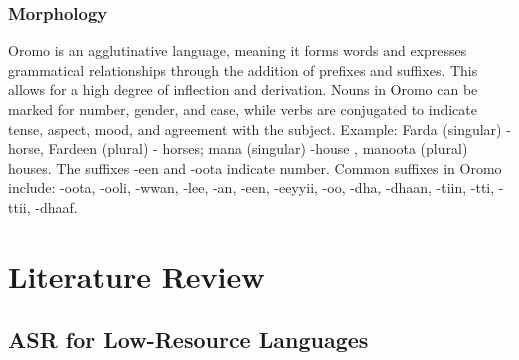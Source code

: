 \documentclass[conference, 9pt]{IEEEtran}
\begin{document}
\begin{table}[htb!]
    \centering
    \caption{Consonants in Oromo language \cite{griefenow2001grammatical}}
    \label{tab:phones}
\end{table}

\subsubsection{Morphology}
Oromo is an agglutinative language, meaning it forms words and expresses grammatical relationships through the addition of prefixes and suffixes. This allows for a high degree of inflection and derivation. Nouns in Oromo can be marked for number, gender, and case, while verbs are conjugated to indicate tense, aspect, mood, and agreement with the subject. Example: Farda (singular) - horse, Fardeen (plural) - horses; mana (singular) -house , manoota (plural) houses.  The suffixes -een and -oota indicate number. Common suffixes in Oromo include: -oota, -ooli, -wwan, -lee, -an, -een, -eeyyii, -oo, -dha, -dhaan, -tiin, -tti, -ttii, -dhaaf.

\section{Literature Review}
\label{sec:literature}

\subsection{ASR for Low-Resource Languages}
\end{document}
